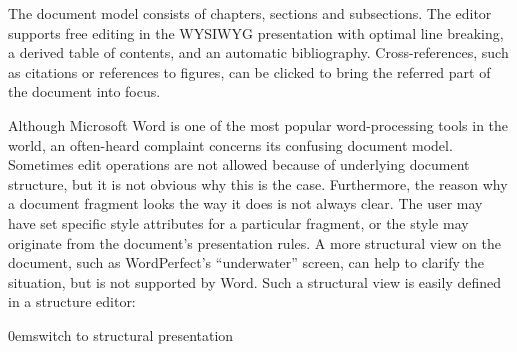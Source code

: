 \documentclass{speauth}
\begin{document}

The document model consists of chapters, sections and subsections. The editor supports free editing in the WYSIWYG presentation with optimal line breaking, a derived table of contents, and an automatic bibliography. Cross-references, such as citations or references to figures, can be clicked to bring the referred part of the document into focus.


Although Microsoft Word is one of the most popular word-processing tools in the world, an often-heard complaint concerns its confusing document model. Sometimes edit operations are not allowed because of underlying document structure, but it is not obvious why this is the case. Furthermore, the reason why a document fragment looks the way it does is not always clear. The user may have set specific style attributes for a particular fragment, or the style may originate from the document's presentation rules. A more structural view on the document, such as WordPerfect's ``underwater'' screen, can help to clarify the situation, but is not supported by Word. Such a structural view is easily defined in a structure editor:



{0em}{\small switch to structural presentation}
\end{document}
